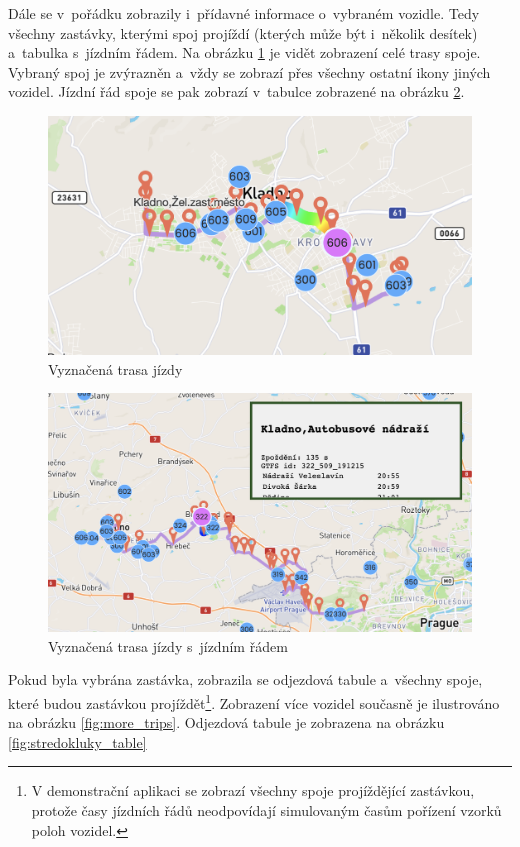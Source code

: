 Dále se v~pořádku zobrazily i~přídavné informace o~vybraném vozidle. Tedy všechny zastávky, kterými spoj projíždí (kterých může být i~několik desítek) a~tabulka s~jízdním řádem. Na obrázku \ref{fig:trip_path} je vidět zobrazení celé trasy spoje. Vybraný spoj je zvýrazněn a~vždy se zobrazí přes všechny ostatní ikony jiných vozidel. Jízdní řád spoje se pak zobrazí v~tabulce zobrazené na obrázku \ref{fig:kladno_aut_322}.


\begin{figure}
   \centering
 \includegraphics[width=0.7\linewidth]{../img/trip_path.png}
 \caption{Vyznačená trasa jízdy}
 \label{fig:trip_path}
\end{figure}


\begin{figure}
   \centering
 \includegraphics[width=0.7\linewidth]{../img/kladno_aut_322.png}
 \caption{Vyznačená trasa jízdy s~jízdním řádem}
 \label{fig:kladno_aut_322}
\end{figure}


\bigbreak

Pokud byla vybrána zastávka, zobrazila se odjezdová tabule a~všechny spoje, které budou zastávkou projíždět\footnote{V demonstrační aplikaci se zobrazí všechny spoje projíždějící zastávkou, protože časy jízdních řádů neodpovídají simulovaným časům pořízení vzorků poloh vozidel.}. Zobrazení více vozidel současně je ilustrováno na obrázku \ref{fig:more_trips}. Odjezdová tabule je zobrazena na obrázku \ref{fig:stredokluky_table}


